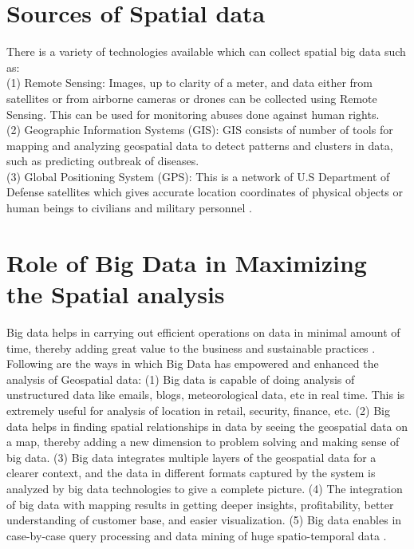 \section{Sources of Spatial data}
There is a variety of technologies available which can collect spatial big data such as: \\
(1) Remote Sensing: Images, up to clarity of a meter, and data either from satellites or from airborne cameras or drones can be collected using Remote Sensing. This can be used for monitoring abuses done against human rights.\\
(2) Geographic Information Systems (GIS): GIS consists of number of tools for mapping and analyzing geospatial data to detect patterns and clusters in data, such as predicting outbreak of diseases.\\
(3) Global Positioning System (GPS): This is a network of U.S Department of Defense satellites which gives accurate location coordinates of physical objects or human beings to civilians and military personnel \cite{link6}.

\section{Role of Big Data in Maximizing the Spatial analysis}
Big data helps in carrying out efficient operations on data in minimal amount of time, thereby adding great value to the business and sustainable practices \cite{link10}. Following are the ways in which Big Data has empowered and enhanced the analysis of Geospatial data:
(1) Big data is capable of doing analysis of unstructured data like emails, blogs, meteorological data, etc in real time. This is extremely useful for analysis of location in retail, security, finance, etc.
(2) Big data helps in finding spatial relationships in data by seeing the geospatial data on a map, thereby adding a new dimension to problem solving and making sense of big data.
(3) Big data integrates multiple layers of the geospatial data for a clearer context, and the data in different formats captured by the system is analyzed by big data technologies to give a complete picture.
(4) The integration of big data with mapping results in getting deeper insights, profitability, better understanding of customer base, and easier visualization.
(5) Big data enables in case-by-case query processing and data mining of huge spatio-temporal data \cite{link10}.

